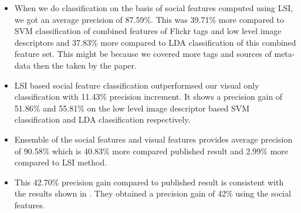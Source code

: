 \begin{itemize}


\item When we do classification on the basis of social features 
computed using LSI, we got an average precision of 87.59\%. This was 
39.71\% more compared to SVM classification of combined features of 
Flickr tags and low level image descriptors and  37.83\% more 
compared to LDA classification of this combined feature set. This might be because we covered more tags and sources of meta-data then the taken by the paper.

\item LSI based social feature classification outperformsed our visual 
only classification with 11.43\% precision increment.  It shows a 
precision gain of 51.86\% and 55.81\% on the low level image 
descriptor based SVM classification and LDA classification respectively.

\item Ensemble of the social features and visual features provides 
average precision of 90.58\% which is 40.83\% more compared 
published result and 2.99\% more compared to LSI method.

\item This 42.70\% precision gain compared to published result is 
consistent with the results shown in \citet{Jure}. They obtained a 
precision gain of 42\% using the social features.


\end{itemize}
